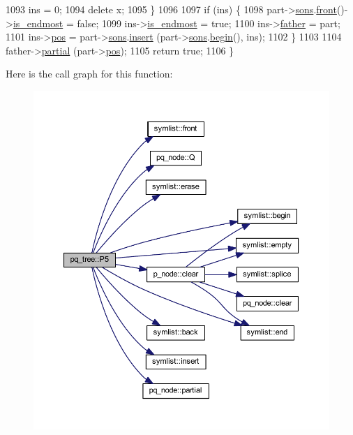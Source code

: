 \begin{DoxyCode}
1093     ins = 0;
1094     \textcolor{keyword}{delete} x;
1095     \}
1096     
1097     \textcolor{keywordflow}{if} (ins) \{
1098     part->\mbox{\hyperlink{classpq__node_a2cc030cfa4560872acea8b50ebd0542b}{sons}}.\mbox{\hyperlink{classsymlist_afd4b55616fc20033d4a47684551866e8}{front}}()->\mbox{\hyperlink{classpq__node_a058dda3d1197dfd2b343d1983d305d79}{is\_endmost}} = \textcolor{keyword}{false};
1099     ins->\mbox{\hyperlink{classpq__node_a058dda3d1197dfd2b343d1983d305d79}{is\_endmost}} = \textcolor{keyword}{true};
1100     ins->\mbox{\hyperlink{classpq__node_a3e7c886498c76c633f057fb42ff9c435}{father}} = part;
1101     ins->\mbox{\hyperlink{classpq__node_a5e8a5defa0fec4ff2e82fabee97296b4}{pos}} = part->\mbox{\hyperlink{classpq__node_a2cc030cfa4560872acea8b50ebd0542b}{sons}}.\mbox{\hyperlink{classsymlist_a8b3327b8a33b180bf1eb802856f755c3}{insert}} (part->\mbox{\hyperlink{classpq__node_a2cc030cfa4560872acea8b50ebd0542b}{sons}}.\mbox{\hyperlink{classsymlist_a525b8d44af5d771fe15916372515cce0}{begin}}(), ins);
1102     \}
1103     
1104     father->\mbox{\hyperlink{classpq__node_aa6830ab47a280f41fe61b7d2f8b508bb}{partial}} (part->\mbox{\hyperlink{classpq__node_a5e8a5defa0fec4ff2e82fabee97296b4}{pos}});
1105     \textcolor{keywordflow}{return} \textcolor{keyword}{true};
1106 \}
\end{DoxyCode}
Here is the call graph for this function\+:\nopagebreak
\begin{figure}[H]
\begin{center}
\leavevmode
\includegraphics[width=350pt]{classpq__tree_a274efe525064f511488091d318f1588e_cgraph}
\end{center}
\end{figure}
